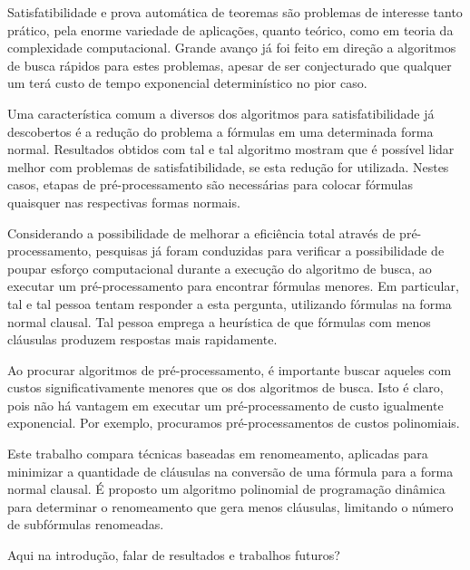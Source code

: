 \indent

Satisfatibilidade e prova automática de teoremas são problemas de interesse tanto prático, pela enorme variedade de aplicações, quanto teórico, como em teoria da complexidade computacional. Grande avanço já foi feito em direção a algoritmos de busca rápidos para estes problemas, apesar de ser conjecturado que qualquer um terá custo de tempo exponencial determinístico no pior caso.

Uma característica comum a diversos dos algoritmos para satisfatibilidade já descobertos é a redução do problema a fórmulas em uma determinada forma normal. Resultados obtidos com tal e tal algoritmo mostram que é possível lidar melhor com problemas de satisfatibilidade, se esta redução for utilizada. Nestes casos, etapas de pré-processamento são necessárias para colocar fórmulas quaisquer nas respectivas formas normais.

Considerando a possibilidade de melhorar a eficiência total através de pré-processa\-mento, pesquisas já foram conduzidas para verificar a possibilidade de poupar esforço computacional durante a execução do algoritmo de busca, ao executar um pré-processamento para encontrar fórmulas menores. Em particular, tal e tal pessoa tentam responder a esta pergunta, utilizando fórmulas na forma normal clausal. Tal pessoa emprega a heurística de que fórmulas com menos cláusulas produzem respostas mais rapidamente.

Ao procurar algoritmos de pré-processamento, é importante buscar aqueles com custos significativamente menores que os dos algoritmos de busca. Isto é claro, pois não há vantagem em executar um pré-processamento de custo igualmente exponencial. Por exemplo, procuramos pré-processamentos de custos polinomiais.

Este trabalho compara técnicas baseadas em renomeamento, aplicadas para minimizar a quantidade de cláusulas na conversão de uma fórmula para a forma normal clausal. É proposto um algoritmo polinomial de programação dinâmica para determinar o renomeamento que gera menos cláusulas, limitando o número de subfórmulas renomeadas.

Aqui na introdução, falar de resultados e trabalhos futuros?